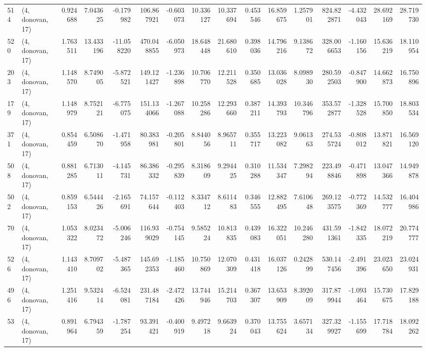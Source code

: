 \begin{tabular}{llrrrrrrrrrrrrrr}
514 &  (4, donovan, 17) &   0.924688 &   7.043625 &  -0.179982 &   106.867921 &  -0.603073 &  10.336127 &  10.337694 &  0.453546 &  16.859675 &   1.257901 &   824.822871 & -4.432043 &  28.692169 &  28.719730 \\
520 &  (4, donovan, 17) &   1.763511 &  13.433196 & -11.058220 &   470.048855 &  -6.050973 &  18.648448 &  21.680610 &  0.398036 &  14.796216 &   9.138672 &   328.006653 & -1.160156 &  15.636219 &  18.110954 \\
203 &  (4, donovan, 17) &   1.148570 &   8.749005 &  -5.872521 &   149.121427 &  -1.236898 &  10.706770 &  12.211528 &  0.350685 &  13.036028 &   8.098930 &   280.592503 & -0.847900 &  14.662873 &  16.750896 \\
179 &  (4, donovan, 17) &   1.148979 &   8.752121 &  -6.775075 &   151.134066 &  -1.267088 &  10.258286 &  12.293660 &  0.387211 &  14.393793 &  10.346796 &   353.572877 & -1.328528 &  15.700850 &  18.803534 \\
371 &  (4, donovan, 17) &   0.854459 &   6.508670 &  -1.471958 &    80.383981 &  -0.205801 &   8.844056 &   8.965711 &  0.355717 &  13.223082 &   9.061363 &   274.535724 & -0.808012 &  13.871821 &  16.569120 \\
508 &  (4, donovan, 17) &   0.881285 &   6.713011 &  -4.145731 &    86.386332 &  -0.295839 &   8.318609 &   9.294425 &  0.310288 &  11.534347 &   7.298294 &   223.498846 & -0.471898 &  13.047366 &  14.949878 \\
502 &  (4, donovan, 17) &   0.859153 &   6.544426 &  -2.165691 &    74.157644 &  -0.112403 &   8.334712 &   8.611483 &  0.346555 &  12.882495 &   7.610648 &   269.123575 & -0.772369 &  14.532777 &  16.404986 \\
70  &  (4, donovan, 17) &   1.053322 &   8.023472 &  -5.006246 &   116.939029 &  -0.754145 &   9.585224 &  10.813835 &  0.439083 &  16.322051 &  10.246280 &   431.591361 & -1.842335 &  18.072219 &  20.774777 \\
526 &  (4, donovan, 17) &   1.143410 &   8.709702 &  -5.487365 &   145.692353 &  -1.185460 &  10.750869 &  12.070309 &  0.431418 &  16.037126 &   0.242899 &   530.147456 & -2.491396 &  23.023650 &  23.024931 \\
496 &  (4, donovan, 17) &   1.251416 &   9.532414 &  -6.524081 &   231.487184 &  -2.472426 &  13.744946 &  15.214703 &  0.367307 &  13.653909 &   8.392009 &   317.879944 & -1.093464 &  15.730675 &  17.829188 \\
53  &  (4, donovan, 17) &   0.891964 &   6.794359 &  -1.787254 &    93.391421 &  -0.400919 &   9.497218 &   9.663924 &  0.370043 &  13.755624 &   3.657134 &   327.329927 & -1.155699 &  17.718784 &  18.092262 \\

\end{tabular}
